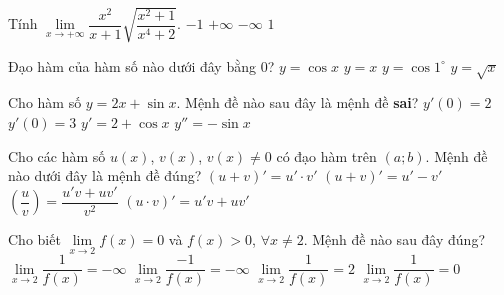\begin{ex}%
Tính $\lim\limits_{x\to +\infty}\dfrac{x^2}{x+1}\sqrt{\dfrac{x^2+1}{x^4+2}}$.
\choice
{$-1$}
{$+\infty$}
{$-\infty$}
{\True $1$}
\end{ex}

\begin{ex}%
Đạo hàm của hàm số nào dưới đây bằng $0$?
\choice
{$y=\cos x$}
{$y=x$}
{\True $y=\cos 1^{\circ}$}
{$y=\sqrt{x}$}
\end{ex}

\begin{ex}%
Cho hàm số $y=2x+\sin x$. Mệnh đề nào sau đây là mệnh đề \textbf{sai}?
\choice
{\True $y'(0)=2$}
{$y'(0)=3$}
{$y'=2+\cos x$}
{$y''=-\sin x$}
\end{ex}

\begin{ex}%
Cho các hàm số $u(x)$, $v(x)$, $v(x)\ne 0$ có đạo hàm trên $(a; b)$. Mệnh đề nào dưới đây là mệnh đề đúng?
\choice
{$(u+v)'=u'\cdot v'$}
{$(u+v)'=u'-v'$}
{$\left(\dfrac{u}{v}\right)=\dfrac{u'v+uv'}{v^2}$}
{\True $(u\cdot v)'=u'v+uv'$}
\end{ex}

\begin{ex}%
Cho biết $\lim \limits_{x\to 2}f(x)=0$ và $f(x)>0$, $\forall x\ne 2$. Mệnh đề nào sau đây đúng?
\choice
{$\lim \limits_{x\to 2}\dfrac{1}{f(x)}=-\infty$}
{\True $\lim \limits_{x\to 2}\dfrac{-1}{f(x)}=-\infty$}
{$\lim \limits_{x\to 2}\dfrac{1}{f(x)}=2$}
{$\lim \limits_{x\to 2}\dfrac{1}{f(x)}=0$}
\end{ex}

